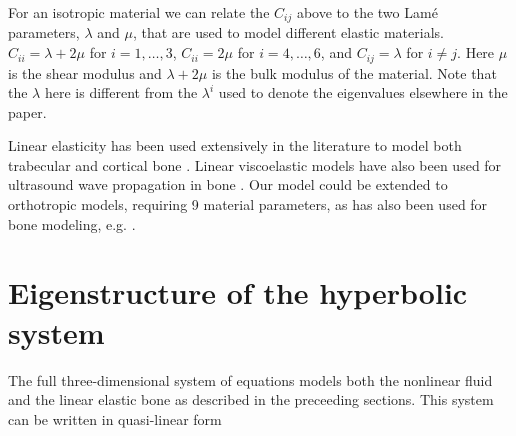 \documentclass{article}
\begin{document}
For an isotropic material
we can relate the $C_{ij}$ above to the two Lam\'{e} parameters,
$\lambda$ and $\mu$, that are used to model different elastic
materials.  $C_{ii} = \lambda + 2 \mu$ for $i=1,\dots,3$, $C_{ii}=2
\mu$ for $i=4,\dots,6$, and $C_{ij} = \lambda$ for $i \ne j$.  Here
$\mu$ is the shear modulus and $\lambda + 2\mu$ is the bulk modulus
of the material.  Note that the $\lambda$ here is different from
the $\lambda^{i}$ used to denote the eigenvalues elsewhere in the
paper.

Linear elasticity has been used extensively in the literature to model both trabecular and cortical bone \cite{keaveny,fung}.  Linear viscoelastic models have also been used for ultrasound wave propagation in bone \cite{visc_bone}.
Our model could be extended to orthotropic models, requiring 9 material parameters, as has also been
used for bone modeling, e.g. \cite{orthotropic}.


\section{Eigenstructure of the hyperbolic system}
\label{sec:eigen}
The full three-dimensional system of equations 
models both the nonlinear fluid and the linear elastic bone as described in the preceeding sections.
This system can be written in quasi-linear form
\end{document}
